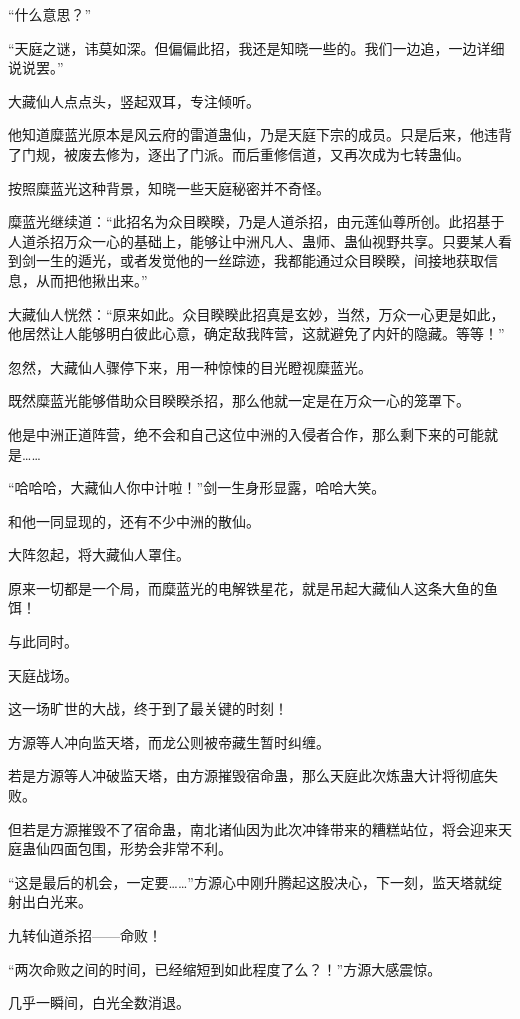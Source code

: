 \begin{this_body}
“什么意思？”

“天庭之谜，讳莫如深。但偏偏此招，我还是知晓一些的。我们一边追，一边详细说说罢。”

大藏仙人点点头，竖起双耳，专注倾听。

他知道糜蓝光原本是风云府的雷道蛊仙，乃是天庭下宗的成员。只是后来，他违背了门规，被废去修为，逐出了门派。而后重修信道，又再次成为七转蛊仙。

按照糜蓝光这种背景，知晓一些天庭秘密并不奇怪。

糜蓝光继续道：“此招名为众目睽睽，乃是人道杀招，由元莲仙尊所创。此招基于人道杀招万众一心的基础上，能够让中洲凡人、蛊师、蛊仙视野共享。只要某人看到剑一生的遁光，或者发觉他的一丝踪迹，我都能通过众目睽睽，间接地获取信息，从而把他揪出来。”

大藏仙人恍然：“原来如此。众目睽睽此招真是玄妙，当然，万众一心更是如此，他居然让人能够明白彼此心意，确定敌我阵营，这就避免了内奸的隐藏。等等！”

忽然，大藏仙人骤停下来，用一种惊悚的目光瞪视糜蓝光。

既然糜蓝光能够借助众目睽睽杀招，那么他就一定是在万众一心的笼罩下。

他是中洲正道阵营，绝不会和自己这位中洲的入侵者合作，那么剩下来的可能就是……

“哈哈哈，大藏仙人你中计啦！”剑一生身形显露，哈哈大笑。

和他一同显现的，还有不少中洲的散仙。

大阵忽起，将大藏仙人罩住。

原来一切都是一个局，而糜蓝光的电解铁星花，就是吊起大藏仙人这条大鱼的鱼饵！

与此同时。

天庭战场。

这一场旷世的大战，终于到了最关键的时刻！

方源等人冲向监天塔，而龙公则被帝藏生暂时纠缠。

若是方源等人冲破监天塔，由方源摧毁宿命蛊，那么天庭此次炼蛊大计将彻底失败。

但若是方源摧毁不了宿命蛊，南北诸仙因为此次冲锋带来的糟糕站位，将会迎来天庭蛊仙四面包围，形势会非常不利。

“这是最后的机会，一定要……”方源心中刚升腾起这股决心，下一刻，监天塔就绽射出白光来。

九转仙道杀招——命败！

“两次命败之间的时间，已经缩短到如此程度了么？！”方源大感震惊。

几乎一瞬间，白光全数消退。


\end{this_body}
